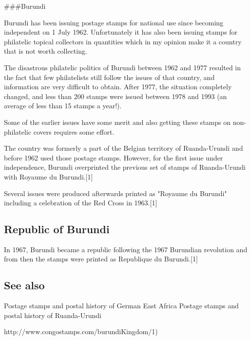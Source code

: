 
\#\#\#Burundi

Burundi has been issuing postage stamps for national use since becoming independent on 1 July 1962. Unfortunately it has also been issuing stamps for philatelic topical collectors in quantities which in my opinion make it a country that is not worth collecting. 

The disastrous philatelic politics of Burundi between 1962 and 1977 resulted in the fact that few philatelists still follow the issues of that country, and information are very difficult to obtain. After 1977, the situation completely changed, and less than 200 stamps were issued between 1978 and 1993 (an average of less than 15 stamps a year!).

Some of the earlier issues have some merit and also getting these stamps on non-philatelic covers requires some effort.


The country was formerly a part of the Belgian territory of Ruanda-Urundi and before 1962 used those postage stamps. However, for the first issue under independence, Burundi overprinted the previous set of stamps of Ruanda-Urundi with Royaume du Burundi.[1]




Several issues were produced afterwards printed as "Royaume du Burundi" including a celebration of the Red Cross in 1963.[1]




\subsection{Republic of Burundi}

In 1967, Burundi became a republic following the 1967 Burundian revolution and from then the stamps were printed as Republique du Burundi.[1]






\subsection{See also}

Postage stamps and postal history of German East Africa
Postage stamps and postal history of Ruanda-Urundi





http://www.congostamps.com/burundiKingdom/1)%



                              
